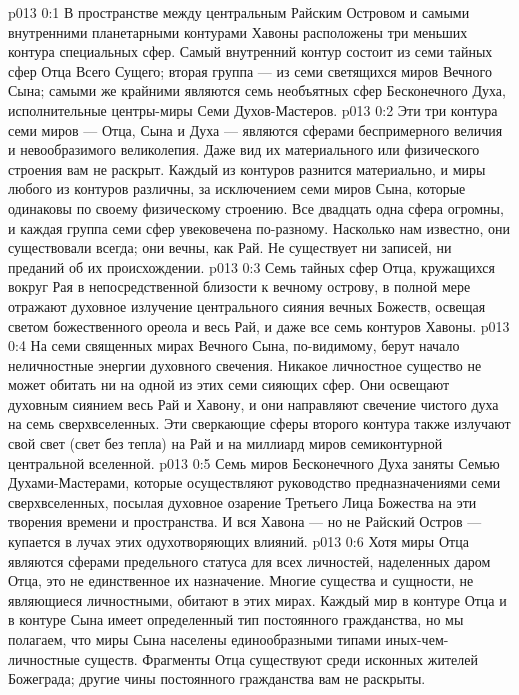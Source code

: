 \author{Совершенствователь Мудрости}
\vs p013 0:1 В пространстве между центральным Райским Островом и самыми внутренними планетарными контурами Хавоны расположены три меньших контура специальных сфер. Самый внутренний контур состоит из семи тайных сфер Отца Всего Сущего; вторая группа --- из семи светящихся миров Вечного Сына; самыми же крайними являются семь необъятных сфер Бесконечного Духа, исполнительные центры\hyp{}миры Семи Духов\hyp{}Мастеров.
\vs p013 0:2 Эти три контура семи миров --- Отца, Сына и Духа --- являются сферами беспримерного величия и невообразимого великолепия. Даже вид их материального или физического строения вам не раскрыт. Каждый из контуров разнится материально, и миры любого из контуров различны, за исключением семи миров Сына, которые одинаковы по своему физическому строению. Все двадцать одна сфера огромны, и каждая группа семи сфер увековечена по\hyp{}разному. Насколько нам известно, они существовали всегда; они вечны, как Рай. Не существует ни записей, ни преданий об их происхождении.
\vs p013 0:3 \pc Семь тайных сфер Отца, кружащихся вокруг Рая в непосредственной близости к вечному острову, в полной мере отражают духовное излучение центрального сияния вечных Божеств, освещая светом божественного ореола и весь Рай, и даже все семь контуров Хавоны.
\vs p013 0:4 \pc На семи священных мирах Вечного Сына, по\hyp{}видимому, берут начало неличностные энергии духовного свечения. Никакое личностное существо не может обитать ни на одной из этих семи сияющих сфер. Они освещают духовным сиянием весь Рай и Хавону, и они направляют свечение чистого духа на семь сверхвселенных. Эти сверкающие сферы второго контура также излучают свой свет (свет без тепла) на Рай и на миллиард миров семиконтурной центральной вселенной.
\vs p013 0:5 \pc Семь миров Бесконечного Духа заняты Семью Духами\hyp{}Мастерами, которые осуществляют руководство предназначениями семи сверхвселенных, посылая духовное озарение Третьего Лица Божества на эти творения времени и пространства. И вся Хавона --- но не Райский Остров --- купается в лучах этих одухотворяющих влияний.
\vs p013 0:6 \pc Хотя миры Отца являются сферами предельного статуса для всех личностей, наделенных даром Отца, это не единственное их назначение. Многие существа и сущности, не являющиеся личностными, обитают в этих мирах. Каждый мир в контуре Отца и в контуре Сына имеет определенный тип постоянного гражданства, но мы полагаем, что миры Сына населены единообразными типами иных\hyp{}чем\hyp{}личностные существ. Фрагменты Отца существуют среди исконных жителей Божеграда; другие чины постоянного гражданства вам не раскрыты.
